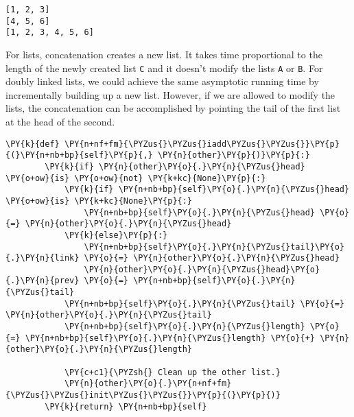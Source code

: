 \begin{Verbatim}
[1, 2, 3]
[4, 5, 6]
[1, 2, 3, 4, 5, 6]

\end{Verbatim}


For lists, concatenation creates a new list.
It takes time proportional to the length of the newly created list \texttt{C} and it doesn't modify the lists \texttt{A} or \texttt{B}.
For doubly linked lists, we could achieve the same asymptotic running time by incrementally building up a new list.
However, if we are allowed to modify the lists, the concatenation can be accomplished by pointing the tail of the first list at the head of the second.

\begin{Verbatim}[commandchars=\\\{\}]
    \PY{k}{def} \PY{n+nf+fm}{\PYZus{}\PYZus{}iadd\PYZus{}\PYZus{}}\PY{p}{(}\PY{n+nb+bp}{self}\PY{p}{,} \PY{n}{other}\PY{p}{)}\PY{p}{:}
        \PY{k}{if} \PY{n}{other}\PY{o}{.}\PY{n}{\PYZus{}head} \PY{o+ow}{is} \PY{o+ow}{not} \PY{k+kc}{None}\PY{p}{:}
            \PY{k}{if} \PY{n+nb+bp}{self}\PY{o}{.}\PY{n}{\PYZus{}head} \PY{o+ow}{is} \PY{k+kc}{None}\PY{p}{:}
                \PY{n+nb+bp}{self}\PY{o}{.}\PY{n}{\PYZus{}head} \PY{o}{=} \PY{n}{other}\PY{o}{.}\PY{n}{\PYZus{}head}
            \PY{k}{else}\PY{p}{:}
                \PY{n+nb+bp}{self}\PY{o}{.}\PY{n}{\PYZus{}tail}\PY{o}{.}\PY{n}{link} \PY{o}{=} \PY{n}{other}\PY{o}{.}\PY{n}{\PYZus{}head}
                \PY{n}{other}\PY{o}{.}\PY{n}{\PYZus{}head}\PY{o}{.}\PY{n}{prev} \PY{o}{=} \PY{n+nb+bp}{self}\PY{o}{.}\PY{n}{\PYZus{}tail}
            \PY{n+nb+bp}{self}\PY{o}{.}\PY{n}{\PYZus{}tail} \PY{o}{=} \PY{n}{other}\PY{o}{.}\PY{n}{\PYZus{}tail}
            \PY{n+nb+bp}{self}\PY{o}{.}\PY{n}{\PYZus{}length} \PY{o}{=} \PY{n+nb+bp}{self}\PY{o}{.}\PY{n}{\PYZus{}length} \PY{o}{+} \PY{n}{other}\PY{o}{.}\PY{n}{\PYZus{}length}

            \PY{c+c1}{\PYZsh{} Clean up the other list.}
            \PY{n}{other}\PY{o}{.}\PY{n+nf+fm}{\PYZus{}\PYZus{}init\PYZus{}\PYZus{}}\PY{p}{(}\PY{p}{)}
        \PY{k}{return} \PY{n+nb+bp}{self}
\end{Verbatim}



